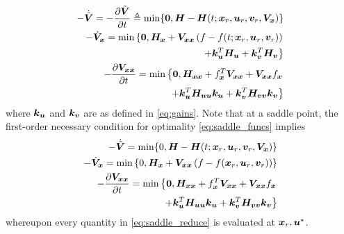 %
\begin{subequations}
	\begin{align}
		- \dot{ \tilde{\bm{V}}} = - \dfrac{\partial \tilde{\bm{V}}}{\partial t} \triangleq \min\{\bm{0}, \bm{H} - \bm{H}(t; \bm{x}_r, \bm{u}_r, \bm{v}_r, \bm{V}_{\bm{x}})\} \\
		-\dot{\bm{V}}_{\bm{x}} = \min \left\{\bm{0}, \bm{H}_{\bm{x}} + \bm{V}_{\bm{x}\bm{x}} \left(f-f(t; \bm{x}_r, \bm{u}_r, \bm{v}_r)\right)  \right. \\
		\left.
		+ \bm{k}_{\bm{u}}^T \bm{H}_{\bm{u} } + \bm{k}_{\bm{v}}^T \bm{H}_{\bm{v}} \right\} \\
		-  \dfrac{\partial \bm{V}_{\bm{x} \bm{x}}}{\partial t} = \min \left\{\bm{0}, \bm{H}_{\bm{x} \bm{x}} + f_{\bm{x}}^T\bm{V}_{\bm{x}\bm{x}} + \bm{V}_{\bm{x}\bm{x}} f_{\bm{x}}  \right. \nonumber \\
		\left.
		+ \bm{k}_{\bm{u}}^T \bm{H}_{\bm{u}  \bm{u}}  \bm{k}_{\bm{u}} +  \bm{k}_{\bm{v}}^T \bm{H}_{\bm{v}  \bm{v}}  \bm{k}_{\bm{v}} \right\}
	\end{align}
\end{subequations}
%
where $\bm{k}_{\bm{u}}$ and $\bm{k}_{\bm{v}}$ are as defined in \eqref{eq:gains}. Note that at a saddle point, the first-order necessary condition for optimality \cf \eqref{eq:saddle_funcs} implies  %
%
\begin{subequations}
	\begin{align}
		- \dot{ \tilde{\bm{V}}} = \min\{0, \bm{H} - \bm{H}(t; \bm{x}_r, \bm{u}_r, \bm{v}_r, \bm{V}_{\bm{x}})\} \\
		-\dot{\bm{V}}_{\bm{x}} = \min \left\{0, \bm{H}_{\bm{x}} + \bm{V}_{\bm{x}\bm{x}} \left(f-f(\bm{x}_r, \bm{u}_r, \bm{v}_r)\right) \right\} \\
		-  \dfrac{\partial \bm{V}_{\bm{x} \bm{x}}}{\partial t} = \min \left\{\bm{0}, \bm{H}_{\bm{x} \bm{x}} + f_{\bm{x}}^T\bm{V}_{\bm{x}\bm{x}} + \bm{V}_{\bm{x}\bm{x}} f_{\bm{x}}  \right. \nonumber \\
		\left.
		+ \bm{k}_{\bm{u}}^T \bm{H}_{\bm{u}  \bm{u}}  \bm{k}_{\bm{u}} +  \bm{k}_{\bm{v}}^T \bm{H}_{\bm{v}  \bm{v}}  \bm{k}_{\bm{v}} \right\}
	\end{align}
	\label{eq:saddle_reduce}
\end{subequations}
%
whereupon every quantity in \eqref{eq:saddle_reduce} is evaluated at $\bm{x}_r, \bm{u}^\star$.

